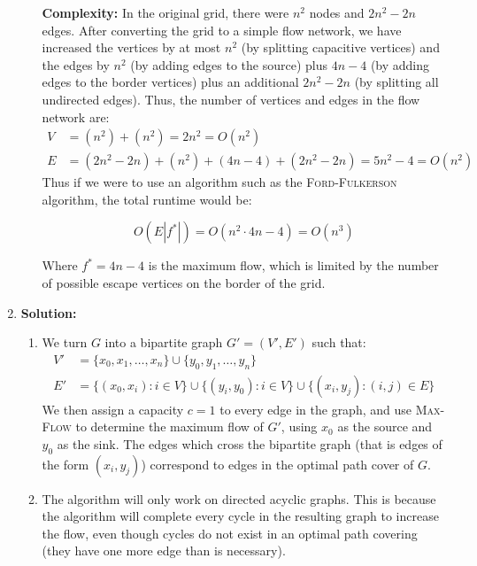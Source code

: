 \documentclass{article}
\begin{document}
\begin{enumerate}
\begin{enumerate}
        \textbf{Complexity:} In the original grid, there were $n^{2}$ nodes and
        $2n^{2}-2n$ edges. After converting the grid to a simple flow network,
        we have increased the vertices by at most $n^2$ (by splitting capacitive
        vertices) and the edges by $n^{2}$ (by adding edges to the source) plus
        $4n-4$ (by adding edges to the border vertices) plus an additional
        $2n^2-2n$ (by splitting all undirected edges). Thus, the number of
        vertices and edges in the flow network are:
        \begin{align*}
            V &= (n^2) + (n^2) = 2n^2 = O(n^2) \\
            E &= (2n^2-2n) + (n^2) + (4n-4) + (2n^2-2n) = 5n^2 - 4 = O(n^2)
        \end{align*}
        Thus if we were to use an algorithm such as the \textsc{Ford-Fulkerson}
        algorithm, the total runtime would be:

        $$ O(E|f^*|) = O(n^2\cdot 4n-4) = O(n^3) $$

        Where $f^*=4n-4$ is the maximum flow, which is limited by the number of
        possible escape vertices on the border of the grid.
    \end{enumerate}

    \item \textbf{Solution:}
    \begin{enumerate}
        \item We turn $G$ into a bipartite graph $G'=(V',E')$ such that:
        \begin{align*}
            V' &= \{x_0, x_1, \ldots, x_n\} \cup \{y_0, y_1, \ldots, y_n\} \\
            E' &= \{(x_0, x_i):i\in V\}\cup \{(y_i,y_0):i\in V\}\cup
            \{(x_i,y_j):(i,j)\in E\}
        \end{align*}
        We then assign a capacity $c = 1$ to every edge in the graph, and use
        \textsc{Max-Flow} to determine the maximum flow of $G'$, using $x_0$ as
        the source and $y_0$ as the sink. The edges which cross the bipartite
        graph (that is edges of the form $(x_i, y_j)$) correspond to edges in
        the optimal path cover of $G$.
        \item The algorithm will only work on directed acyclic graphs. This is
        because the algorithm will complete every cycle in the resulting graph
        to increase the flow, even though cycles do not exist in an optimal path
        covering (they have one more edge than is necessary).
    \end{enumerate}
\end{enumerate}
\end{document}
